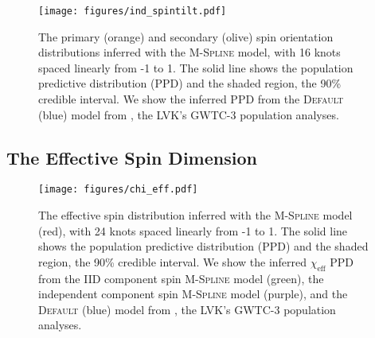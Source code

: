 \begin{figure}
    \begin{centering}
        \texttt{[image: figures/ind\_spintilt.pdf]}
        \caption{The primary (orange) and secondary (olive) spin orientation distributions inferred with the \textsc{M-Spline} model, 
        with 16 knots spaced linearly from -1 to 1. The solid line shows the population predictive distribution (PPD) and the shaded region, the 90\% credible interval. 
        We show the inferred PPD from the \textsc{Default} (blue) model from \citet{o3b_astro_dist}, the LVK's GWTC-3 population analyses.}
        \label{fig:ind_spintilt_dist}
    \end{centering}
\end{figure}

\subsection{The Effective Spin Dimension}

\begin{figure} 
    \begin{centering}
        \texttt{[image: figures/chi\_eff.pdf]}
        \caption{The effective spin distribution inferred with the \textsc{M-Spline} model (red), with 24 knots spaced linearly from -1 to 1. 
        The solid line shows the population predictive distribution (PPD) and the shaded region, the 90\% credible interval. We show the inferred $\chi_\mathrm{eff}$ 
        PPD from the IID component spin \textsc{M-Spline} model (green), the independent component spin \textsc{M-Spline} model (purple), 
        and the \textsc{Default} (blue) model from \citet{o3b_astro_dist}, the LVK's GWTC-3 population analyses.}
        \label{fig:chieff_dist}
    \end{centering}
\end{figure}

